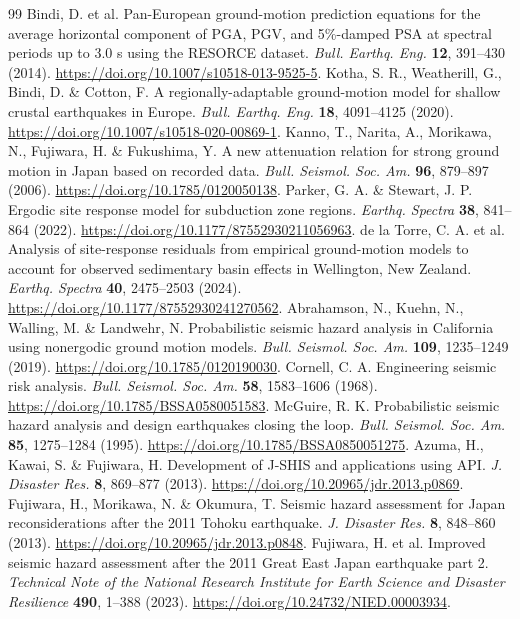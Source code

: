 \begin{thebibliography}{99}
 Bindi, D. et al. Pan-European ground-motion prediction equations for the average horizontal component of PGA, PGV, and 5\%-damped PSA at spectral periods up to 3.0 s using the RESORCE dataset. \textit{Bull. Earthq. Eng.} \textbf{12}, 391--430 (2014). \url{https://doi.org/10.1007/s10518-013-9525-5}.
 Kotha, S. R., Weatherill, G., Bindi, D. \& Cotton, F. A regionally-adaptable ground-motion model for shallow crustal earthquakes in Europe. \textit{Bull. Earthq. Eng.} \textbf{18}, 4091--4125 (2020). \url{https://doi.org/10.1007/s10518-020-00869-1}.
 Kanno, T., Narita, A., Morikawa, N., Fujiwara, H. \& Fukushima, Y. A new attenuation relation for strong ground motion in Japan based on recorded data. \textit{Bull. Seismol. Soc. Am.} \textbf{96}, 879--897 (2006). \url{https://doi.org/10.1785/0120050138}.
 Parker, G. A. \& Stewart, J. P. Ergodic site response model for subduction zone regions. \textit{Earthq. Spectra} \textbf{38}, 841--864 (2022). \url{https://doi.org/10.1177/87552930211056963}.
 de la Torre, C. A. et al. Analysis of site-response residuals from empirical ground-motion models to account for observed sedimentary basin effects in Wellington, New Zealand. \textit{Earthq. Spectra} \textbf{40}, 2475--2503 (2024). \url{https://doi.org/10.1177/87552930241270562}.
 Abrahamson, N., Kuehn, N., Walling, M. \& Landwehr, N. Probabilistic seismic hazard analysis in California using nonergodic ground motion models. \textit{Bull. Seismol. Soc. Am.} \textbf{109}, 1235--1249 (2019). \url{https://doi.org/10.1785/0120190030}.
 Cornell, C. A. Engineering seismic risk analysis. \textit{Bull. Seismol. Soc. Am.} \textbf{58}, 1583--1606 (1968). \url{https://doi.org/10.1785/BSSA0580051583}.
 McGuire, R. K. Probabilistic seismic hazard analysis and design earthquakes closing the loop. \textit{Bull. Seismol. Soc. Am.} \textbf{85}, 1275--1284 (1995). \url{https://doi.org/10.1785/BSSA0850051275}.
 Azuma, H., Kawai, S. \& Fujiwara, H. Development of J-SHIS and applications using API. \textit{J. Disaster Res.} \textbf{8}, 869--877 (2013). \url{https://doi.org/10.20965/jdr.2013.p0869}.
 Fujiwara, H., Morikawa, N. \& Okumura, T. Seismic hazard assessment for Japan reconsiderations after the 2011 Tohoku earthquake. \textit{J. Disaster Res.} \textbf{8}, 848--860 (2013). \url{https://doi.org/10.20965/jdr.2013.p0848}.
 Fujiwara, H. et al. Improved seismic hazard assessment after the 2011 Great East Japan earthquake part 2. \textit{Technical Note of the National Research Institute for Earth Science and Disaster Resilience} \textbf{490}, 1--388 (2023). \url{https://doi.org/10.24732/NIED.00003934}.

\end{thebibliography}
